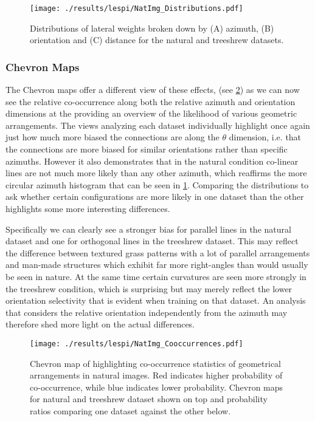 \begin{figure}
	\centering
        \texttt{[image: ./results/lespi/NatImg\_Distributions.pdf]}
	\caption[Distributions of lateral weights broken down by azimuth,
      orientation and distance.]{Distributions of lateral weights
      broken down by (A) azimuth, (B) orientation and (C) distance for
      the natural and treeshrew datasets.}
	\label{NatImgDistributions}
\end{figure}

\subsubsection{Chevron Maps}

The Chevron maps offer a different view of these effects, (see
\ref{NatImgCooccurrences}) as we can now see the relative
co-occurrence along both the relative azimuth and orientation
dimensions at the providing an overview of the likelihood of various
geometric arrangements. The views analyzing each dataset individually
highlight once again just how much more biased the connections are
along the $\theta$ dimension, i.e. that the connections are more
biased for similar orientations rather than specific azimuths. However
it also demonstrates that in the natural condition co-linear lines are
not much more likely than any other azimuth, which reaffirms the more
circular azimuth histogram that can be seen in
\ref{NatImgDistributions}. Comparing the distributions to ask whether
certain configurations are more likely in one dataset than the other
highlights some more interesting differences.

Specifically we can clearly see a stronger bias for parallel lines in
the natural dataset and one for orthogonal lines in the treeshrew
dataset. This may reflect the difference between textured grass
patterns with a lot of parallel arrangements and man-made structures
which exhibit far more right-angles than would usually be seen in
nature. At the same time certain curvatures are seen more strongly in
the treeshrew condition, which is surprising but may merely reflect
the lower orientation selectivity that is evident when training on
that dataset. An analysis that considers the relative orientation
independently from the azimuth may therefore shed more light on the
actual differences.

\begin{figure}
	\centering
        \texttt{[image: ./results/lespi/NatImg\_Cooccurrences.pdf]}
	\caption[Chevron map of highlighting co-occurrence statistics of
      geometrical arrangements in natural images.]{Chevron map of
      highlighting co-occurrence statistics of geometrical
      arrangements in natural images. Red indicates higher probability
      of co-occurrence, while blue indicates lower
      probability. Chevron maps for natural and treeshrew dataset
      shown on top and probability ratios comparing one dataset
      against the other below.}
	\label{NatImgCooccurrences}
\end{figure}

